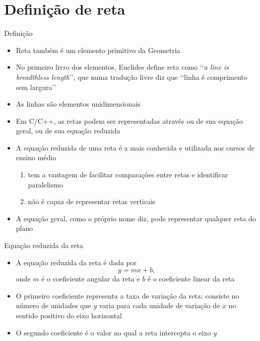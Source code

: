 \section{Definição de reta}

\begin{frame}[fragile]{Definição}

    \begin{itemize}
        \item Reta também é um elemento primitivo da Geometria

        \item No primeiro livro dos elementos, Euclides define reta como 
            \lq\lq \textit{a line is breadthless length}\rq\rq, que numa tradução livre 
            diz que \lq\lq linha é comprimento sem largura\rq\rq

        \item As linhas são elementos unidimensionais

        \item Em C/C++, as retas podem ser representadas através ou de sua equação geral, ou de
            sua equação reduzida

        \item  A equação reduzida de uma reta é a mais conhecida e utilizada nos cursos de ensino médio
        \begin{enumerate}
            \item tem a vantagem de facilitar comparações entre retas e identificar paralelismo
            \item não é capaz de representar retas verticais
        \end{enumerate}

        \item A equação geral, como o próprio nome diz, pode representar qualquer reta do plano
   \end{itemize}

\end{frame}

\begin{frame}[fragile]{Equação reduzida da reta}

    \begin{itemize}
        \item A equação reduzida da reta é dada por
        \[
            y = mx + b,
        \]
        onde $m$ é o coeficiente angular da reta e $b$ é o coeficiente linear da reta

        \item O primeiro coeficiente representa a taxa de variação da reta: consiste no número de 
        unidades que $y$ varia para cada unidade de variação de $x$ no sentido positivo do eixo horizontal

        \item O segundo coeficiente é o valor no qual a reta intercepta o eixo $y$


    \end{itemize}

\end{frame}

